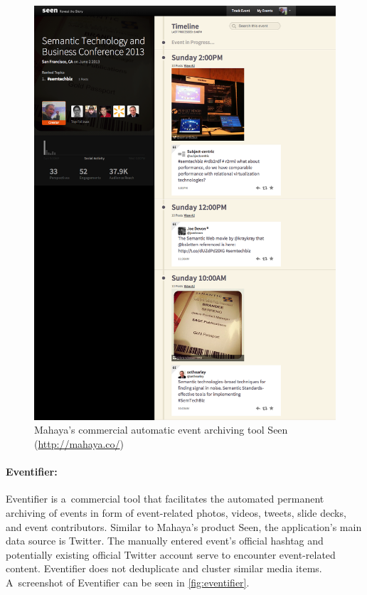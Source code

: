 \begin{figure}
  \centering
  \includegraphics[width=\linewidth]{seen.png}
  \caption[Mahaya's commercial automatic event archiving tool Seen]{Mahaya's commercial automatic event archiving tool Seen
    (\url{http://mahaya.co/})}
  \label{fig:seen}
\end{figure}

\paragraph{Eventifier:}

Eventifier is a~commercial tool that facilitates the automated permanent archiving of events
in form of event-related photos, videos, tweets, slide decks, 
and event contributors.
Similar to Mahaya's product Seen,
the application's main data source is Twitter.
The manually entered event's official hashtag and potentially existing
official Twitter account serve to encounter event-related content.
Eventifier does not deduplicate and cluster
similar media items.
A~screenshot of Eventifier can be seen in \autoref{fig:eventifier}.

